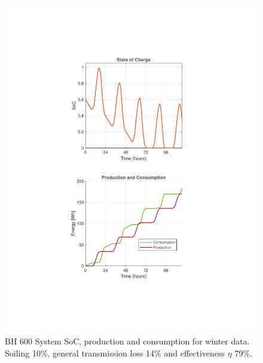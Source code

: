 \hspace{0.02\textwidth}%
\begin{minipage}[t]{0.32\textwidth} %
    \begin{figure}[H]
        \centering
        \includegraphics[width=\linewidth]{photos/Winter_SOC&Consumption_with_all_loss_5Days_600System.pdf} %
        \captionsetup{font=footnotesize} %
        \caption{BH 600 System SoC, production and consumption for winter data. Soiling 10\%, general transmission loss 14\% and effectiveness $\eta$ 79\%.}
        \label{result:fig:600_winter_soc}
    \end{figure}
\end{minipage}
\hspace{0.02\textwidth}%
